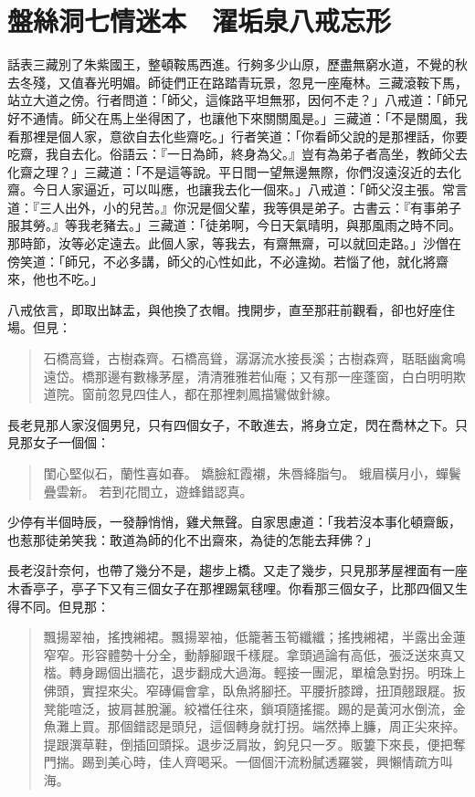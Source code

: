 
\chapter{盤絲洞七情迷本　濯垢泉八戒忘形}

話表三藏別了朱紫國王，整頓鞍馬西進。行夠多少山原，歷盡無窮水道，不覺的秋去冬殘，又值春光明媚。師徒們正在路踏青玩景，忽見一座庵林。三藏滾鞍下馬，站立大道之傍。行者問道：「師父，這條路平坦無邪，因何不走？」八戒道：「師兄好不通情。師父在馬上坐得困了，也讓他下來關關風是。」三藏道：「不是關風，我看那裡是個人家，意欲自去化些齋吃。」行者笑道：「你看師父說的是那裡話，你要吃齋，我自去化。俗語云：『一日為師，終身為父。』豈有為弟子者高坐，教師父去化齋之理？」三藏道：「不是這等說。平日間一望無邊無際，你們沒遠沒近的去化齋。今日人家逼近，可以叫應，也讓我去化一個來。」八戒道：「師父沒主張。常言道：『三人出外，小的兒苦。』你況是個父輩，我等俱是弟子。古書云：『有事弟子服其勞。』等我老豬去。」三藏道：「徒弟啊，今日天氣晴明，與那風雨之時不同。那時節，汝等必定遠去。此個人家，等我去，有齋無齋，可以就回走路。」沙僧在傍笑道：「師兄，不必多講，師父的心性如此，不必違拗。若惱了他，就化將齋來，他也不吃。」

八戒依言，即取出缽盂，與他換了衣帽。拽開步，直至那莊前觀看，卻也好座住場。但見：
\begin{quote}
石橋高聳，古樹森齊。石橋高聳，潺潺流水接長溪；古樹森齊，聒聒幽禽鳴遠岱。橋那邊有數椽茅屋，清清雅雅若仙庵；又有那一座蓬窗，白白明明欺道院。窗前忽見四佳人，都在那裡刺鳳描鸞做針線。
\end{quote}

長老見那人家沒個男兒，只有四個女子，不敢進去，將身立定，閃在喬林之下。只見那女子一個個：
\begin{quote}
閨心堅似石，蘭性喜如春。
嬌臉紅霞襯，朱唇絳脂勻。
蛾眉橫月小，蟬鬢疊雲新。
若到花間立，遊蜂錯認真。
\end{quote}

少停有半個時辰，一發靜悄悄，雞犬無聲。自家思慮道：「我若沒本事化頓齋飯，也惹那徒弟笑我：敢道為師的化不出齋來，為徒的怎能去拜佛？」

長老沒計奈何，也帶了幾分不是，趨步上橋。又走了幾步，只見那茅屋裡面有一座木香亭子，亭子下又有三個女子在那裡踢氣毬哩。你看那三個女子，比那四個又生得不同。但見那：
\begin{quote}
飄揚翠袖，搖拽緗裙。飄揚翠袖，低籠著玉筍纖纖；搖拽緗裙，半露出金蓮窄窄。形容體勢十分全，動靜腳跟千樣屣。拿頭過論有高低，張泛送來真又楷。轉身踢個出牆花，退步翻成大過海。輕接一團泥，單槍急對拐。明珠上佛頭，實捏來尖。窄磚偏會拿，臥魚將腳抷。平腰折膝蹲，扭頂翹跟屣。扳凳能喧泛，披肩甚脫灑。絞襠任往來，鎖項隨搖擺。踢的是黃河水倒流，金魚灘上買。那個錯認是頭兒，這個轉身就打拐。端然捧上臁，周正尖來捽。提跟潠草鞋，倒插回頭採。退步泛肩妝，鉤兒只一歹。販簍下來長，便把奪門揣。踢到美心時，佳人齊喝采。一個個汗流粉膩透羅裳，興懶情疏方叫海。
\end{quote}

